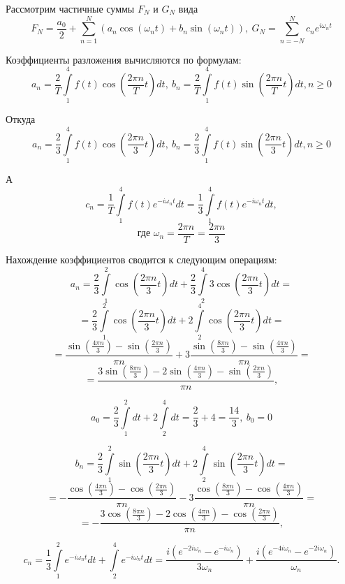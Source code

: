 \documentclass[a4paper,hidelinks,14pt]{extarticle}
\begin{document}
	Рассмотрим частичные суммы $F_N$ и $G_N$ вида
	$$
		F_N = \frac{a_0}{2} + \sum \limits_{n=1}^{N} (a_n \cos(\omega_n t) + b_n \sin(\omega_n t)), \ 
		G_N = \sum \limits_{n=-N}^{N} c_n e^{i \omega_n t}
	$$
	
	Коэффициенты разложения вычисляются по формулам:
	$$
	a_n = \frac{2}{T} \int \limits_{1}^{4}f(t)\cos\left(\frac{2\pi n}{T} t\right) dt, \ 
	b_n = \frac{2}{T} \int \limits_{1}^{4}f(t)\sin\left(\frac{2\pi n}{T} t\right) dt, n \geq 0
	$$
	
	Откуда 
	$$
	a_n = \frac{2}{3} \int \limits_{1}^{4}f(t)\cos\left(\frac{2\pi n}{3} t\right) dt, \ 
	b_n = \frac{2}{3} \int \limits_{1}^{4}f(t)\sin\left(\frac{2\pi n}{3} t\right) dt, n \geq 0
	$$
	
	А 
	$$
	c_n = \frac{1}{T} \int \limits_{1}^{4} f(t) e^{-i \omega_n t} dt = \frac{1}{3} \int \limits_{1}^{4} f(t) e^{-i \omega_n t} dt,
	$$
	$$
	\text{где }\omega_n = \frac{2 \pi n}{T} = \frac{2\pi n}{3}
	$$
	
	Нахождение коэффициентов сводится к следующим операциям:
	$$
	a_n = \frac{2}{3} \int\limits_{1}^{2} \cos\left(\frac{2\pi n}{3} t\right) dt + \frac{2}{3} \int\limits_{2}^{4} 3 \cos\left(\frac{2\pi n}{3} t\right) dt =
	$$
	$$
	= \frac{2}{3} \int\limits_{1}^{2} \cos\left(\frac{2\pi n}{3} t\right) dt + 2 \int\limits_{2}^{4} \cos\left(\frac{2\pi n}{3} t\right) dt =
	$$
	$$
	=\frac{\sin\left(\frac{4 \pi n}{3} \right) - \sin\left(\frac{2 \pi n}{3} \right)}{\pi n} + 3\frac{\sin\left(\frac{8 \pi n}{3} \right) - \sin\left(\frac{4 \pi n}{3} \right)}{\pi n} =
	$$
	$$
	=\frac{3\sin\left( \frac{8\pi n}{3} \right) -2\sin\left(\frac{4 \pi n}{3} \right) - \sin\left(\frac{2 \pi n}{3} \right)}{\pi n},
	$$
	
	$$
	a_0 = \frac{2}{3} \int\limits^{2}_{1} dt + 2 \int\limits^{4}_{2} dt = \frac{2}{3} + 4 = \frac{14}{3},\ b_0 = 0
	$$
	
	$$
	b_n =\frac{2}{3} \int\limits_{1}^{2} \sin\left(\frac{2\pi n}{3} t\right) dt + 2 \int\limits_{2}^{4} \sin\left(\frac{2\pi n}{3} t\right) dt =
	$$
	$$
	= -\frac{\cos\left(\frac{4 \pi n}{3} \right) - \cos\left(\frac{2 \pi n}{3} \right)}{\pi n} - 3\frac{\cos\left(\frac{8 \pi n}{3} \right) - \cos\left(\frac{4 \pi n}{3} \right)}{\pi n} =
	$$
	$$
	=-\frac{3\cos\left( \frac{8\pi n}{3} \right) -2\cos\left(\frac{4 \pi n}{3} \right) - \cos\left(\frac{2 \pi n}{3} \right)}{\pi n},
	$$
	
	$$
	c_n = \frac{1}{3} \int\limits_{1}^{2} e^{-i\omega_n t} dt + \int\limits_{2}^{4} e^{-i\omega_n t} dt = \frac{i(e^{-2i\omega_n} - e^{-i\omega_n})}{3\omega_n} + \frac{i(e^{-4i\omega_n} - e^{-2i\omega_n})}{\omega_n}.
	$$
	
\end{document}
